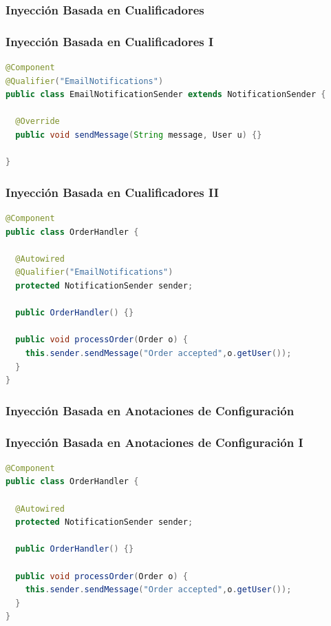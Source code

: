 \documentclass[a4paper,t,xcolor=pst,dvips,colortheme]{beamer}
\begin{document}
\subsubsection{Inyección Basada en Cualificadores}

\begin{frame}[c,fragile]
	\frametitle{Inyección Basada en Cualificadores I}
\begin{lstlisting}[basicstyle=\footnotesize,language=Java]
@Component
@Qualifier("EmailNotifications")
public class EmailNotificationSender extends NotificationSender {

  @Override
  public void sendMessage(String message, User u) {}
	
}
\end{lstlisting}
\end{frame}

\begin{frame}[c,fragile]
	\frametitle{Inyección Basada en Cualificadores II}
\begin{lstlisting}[basicstyle=\footnotesize,language=Java]
@Component
public class OrderHandler {

  @Autowired
  @Qualifier("EmailNotifications")
  protected NotificationSender sender;
	
  public OrderHandler() {}
	
  public void processOrder(Order o) {
    this.sender.sendMessage("Order accepted",o.getUser());
  }
}
\end{lstlisting}
\end{frame}

\subsubsection{Inyección Basada en Anotaciones de Configuración}

\begin{frame}[c,fragile]
	\frametitle{Inyección Basada en Anotaciones de Configuración I}
\begin{lstlisting}[basicstyle=\footnotesize,language=Java]
@Component
public class OrderHandler {

  @Autowired
  protected NotificationSender sender;
	
  public OrderHandler() {}
	
  public void processOrder(Order o) {
    this.sender.sendMessage("Order accepted",o.getUser());
  }
}
\end{lstlisting}
\end{frame}
\end{document}
